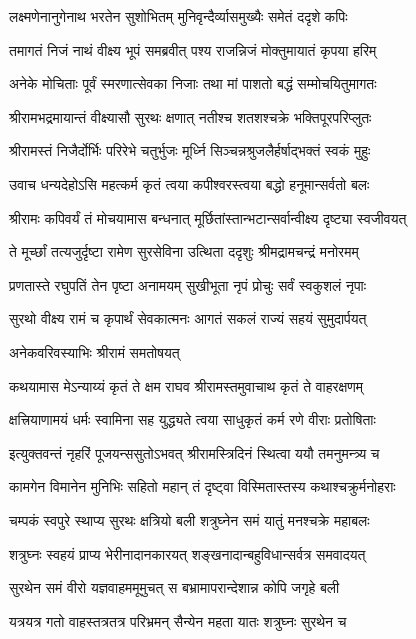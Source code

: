\twolineshloka
{लक्ष्मणेनानुगेनाथ भरतेन सुशोभितम्}
{मुनिवृन्दैर्व्यासमुख्यैः समेतं ददृशे कपिः}%

\twolineshloka
{तमागतं निजं नाथं वीक्ष्य भूपं समब्रवीत्}
{पश्य राजन्निजं मोक्तुमायातं कृपया हरिम्}%

\twolineshloka
{अनेके मोचिताः पूर्वं स्मरणात्सेवका निजाः}
{तथा मां पाशतो बद्धं सम्मोचयितुमागतः}%

\twolineshloka
{श्रीरामभद्रमायान्तं वीक्ष्यासौ सुरथः क्षणात्}
{नतीश्च शतशश्चक्रे भक्तिपूरपरिप्लुतः}%

\twolineshloka
{श्रीरामस्तं निजैर्दोर्भिः परिरेभे चतुर्भुजः}
{मूर्ध्नि सिञ्चन्नश्रुजलैर्हर्षाद्भक्तं स्वकं मुहुः}%

\twolineshloka
{उवाच धन्यदेहोऽसि महत्कर्म कृतं त्वया}
{कपीश्वरस्त्वया बद्धो हनूमान्सर्वतो बलः}%

\twolineshloka
{श्रीरामः कपिवर्यं तं मोचयामास बन्धनात्}
{मूर्छितांस्तान्भटान्सर्वान्वीक्ष्य दृष्ट्या स्वजीवयत्}%

\twolineshloka
{ते मूर्च्छां तत्यजुर्दृष्टा रामेण सुरसेविना}
{उत्थिता ददृशुः श्रीमद्रामचन्द्रं मनोरमम्}%

\twolineshloka
{प्रणतास्ते रघुपतिं तेन पृष्टा अनामयम्}
{सुखीभूता नृपं प्रोचुः सर्वं स्वकुशलं नृपाः}%

\twolineshloka
{सुरथो वीक्ष्य रामं च कृपार्थं सेवकात्मनः}
{आगतं सकलं राज्यं सहयं सुमुदार्पयत्}%

अनेकवरिवस्याभिः श्रीरामं समतोषयत्

\twolineshloka
{कथयामास मेऽन्याय्यं कृतं ते क्षम राघव}
{श्रीरामस्तमुवाचाथ कृतं ते वाहरक्षणम्}%

\twolineshloka
{क्षत्त्रियाणामयं धर्मः स्वामिना सह युद्ध्यते}
{त्वया साधुकृतं कर्म रणे वीराः प्रतोषिताः}%

\twolineshloka
{इत्युक्तवन्तं नृहरिं पूजयन्ससुतोऽभवत्}
{श्रीरामस्त्रिदिनं स्थित्वा ययौ तमनुमन्त्र्य च}%

\twolineshloka
{कामगेन विमानेन मुनिभिः सहितो महान्}
{तं दृष्ट्वा विस्मितास्तस्य कथाश्चक्रुर्मनोहराः}%

\twolineshloka
{चम्पकं स्वपुरे स्थाप्य सुरथः क्षत्रियो बली}
{शत्रुघ्नेन समं यातुं मनश्चक्रे महाबलः}%

\twolineshloka
{शत्रुघ्नः स्वहयं प्राप्य भेरीनादानकारयत्}
{शङ्खनादान्बहुविधान्सर्वत्र समवादयत्}%

\twolineshloka
{सुरथेन समं वीरो यज्ञवाहममूमुचत्}
{स बभ्रामापरान्देशान्न कोपि जगृहे बली}%

\twolineshloka
{यत्रयत्र गतो वाहस्तत्रतत्र परिभ्रमन्}
{सैन्येन महता यातः शत्रुघ्नः सुरथेन च}%

